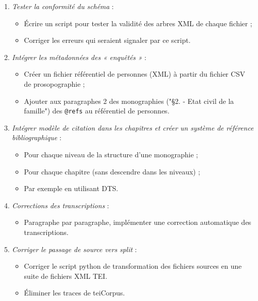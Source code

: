 \begin{enumerate}
    \item \textit{Tester la conformité du schéma} :
    \begin{itemize}
        \item  Écrire un script pour tester la validité des arbres XML de chaque fichier ;
        \item  Corriger les erreurs qui seraient signaler par ce script.
    \end{itemize}

    \item \textit{Intégrer les métadonnées des « enquêtés »} :
    \begin{itemize}
        \item  Créer un fichier référentiel de personnes (XML) à partir du fichier CSV de prosopographie ;
        \item  Ajouter aux paragraphes 2 des monographies ("§2. - Etat civil de la famille") des \texttt{@refs} au référentiel de personnes.
    \end{itemize}

    \item \textit{Intégrer modèle de citation dans les chapitres et créer un système de référence bibliographique} :
    \begin{itemize}
        \item  Pour chaque niveau de la structure d'une monographie  ;
        \item  Pour chaque chapitre (sans descendre dans les niveaux) ;
        \item  Par exemple en utilisant DTS.
    \end{itemize}

    \item \textit{Corrections des transcriptions} :
    \begin{itemize}
        \item  Paragraphe par paragraphe, implémenter une correction automatique des transcriptions.
    \end{itemize}

    \item \textit{Corriger le passage de source vers split} :
    \begin{itemize}
        \item  Corriger le script python de transformation des fichiers sources en une suite de fichiers XML TEI.
        \item  Éliminer les traces de teiCorpus.
    \end{itemize}


\end{enumerate}
